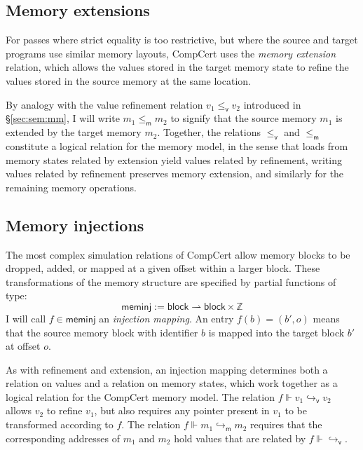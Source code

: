 \documentclass[11pt,oneside]{book}
\theoremstyle{definition}
\newcommand{\kw}[1]{\ensuremath{ \mathsf{#1} }}
\newcommand{\vref}{\le_\kw{v}}   %
\newcommand{\mext}{\le_\kw{m}}   %
\begin{document}
\subsection{Memory extensions} \label{sec:memext} %

For passes where strict equality is too restrictive,
but where the source and target programs
use similar memory layouts,
CompCert uses the \emph{memory extension} relation,
which allows the values
stored in the target memory state to refine
the values stored in the source memory at the same location.

By analogy with
the value refinement relation $v_1 \vref v_2$
introduced in \S\ref{sec:sem:mm},
I will write $m_1 \mext m_2$ to signify that
the source memory $m_1$ is extended by
the target memory $m_2$.
Together,
the relations $\vref$ and $\mext$
constitute a logical relation for the memory model,
in the sense that
loads from memory states related by extension
yield values related by refinement,
writing values related by refinement
preserves memory extension,
and similarly for the remaining memory operations.


\subsection{Memory injections} \label{sec:meminj} %

The most complex simulation relations of CompCert
allow memory blocks to be dropped, added, or
mapped at a given offset within a larger block.
These transformations of the memory structure
are specified by partial functions of type:
\[
  \kw{meminj} := \kw{block} \rightharpoonup \kw{block} \times \mathbb{Z}
\]
I will call $f \in \kw{meminj}$
an \emph{injection mapping}.
An entry $f(b) = (b', o)$
means that the source memory block with identifier $b$
is mapped into the target block $b'$
at offset $o$.

As with refinement and extension,
an injection mapping determines both
a relation on values and
a relation on memory states,
which work together
as a logical relation for the CompCert memory model.
The relation $f \Vdash v_1 \hookrightarrow_\kw{v} v_2$
allows $v_2$ to refine $v_1$,
but also requires any pointer present in $v_1$
to be transformed according to $f$.
The relation $f \Vdash m_1 \hookrightarrow_\kw{m} m_2$
requires that the corresponding addresses of $m_1$ and $m_2$
hold values that are related by $f \Vdash {\hookrightarrow_\kw{v}}$.
\end{document}
